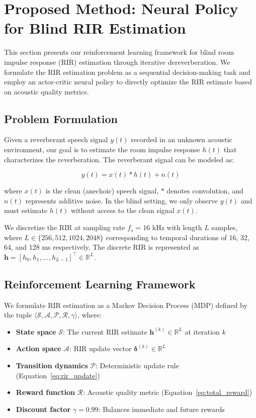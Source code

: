 \section{Proposed Method: Neural Policy for Blind RIR Estimation}
\label{sec:method}

This section presents our reinforcement learning framework for blind room impulse response (RIR) estimation through iterative dereverberation. We formulate the RIR estimation problem as a sequential decision-making task and employ an actor-critic neural policy to directly optimize the RIR estimate based on acoustic quality metrics.

\subsection{Problem Formulation}
\label{subsec:formulation}

Given a reverberant speech signal $y(t)$ recorded in an unknown acoustic environment, our goal is to estimate the room impulse response $h(t)$ that characterizes the reverberation. The reverberant signal can be modeled as:

\begin{equation}
y(t) = x(t) * h(t) + n(t)
\label{eq:convolution_model}
\end{equation}

\noindent where $x(t)$ is the clean (anechoic) speech signal, $*$ denotes convolution, and $n(t)$ represents additive noise. In the blind setting, we only observe $y(t)$ and must estimate $h(t)$ without access to the clean signal $x(t)$.

We discretize the RIR at sampling rate $f_s = 16$ kHz with length $L$ samples, where $L \in \{256, 512, 1024, 2048\}$ corresponding to temporal durations of 16, 32, 64, and 128 ms respectively. The discrete RIR is represented as $\mathbf{h} = [h_0, h_1, \ldots, h_{L-1}]^\top \in \mathbb{R}^L$.

\subsection{Reinforcement Learning Framework}
\label{subsec:rl_framework}

We formulate RIR estimation as a Markov Decision Process (MDP) defined by the tuple $\langle \mathcal{S}, \mathcal{A}, \mathcal{P}, \mathcal{R}, \gamma \rangle$, where:

\begin{itemize}
    \item \textbf{State space} $\mathcal{S}$: The current RIR estimate $\mathbf{h}^{(k)} \in \mathbb{R}^L$ at iteration $k$
    \item \textbf{Action space} $\mathcal{A}$: RIR update vector $\boldsymbol{\delta}^{(k)} \in \mathbb{R}^L$
    \item \textbf{Transition dynamics} $\mathcal{P}$: Deterministic update rule (Equation~\ref{eq:rir_update})
    \item \textbf{Reward function} $\mathcal{R}$: Acoustic quality metric (Equation~\ref{eq:total_reward})
    \item \textbf{Discount factor} $\gamma = 0.99$: Balances immediate and future rewards
\end{itemize}

